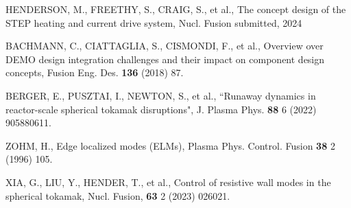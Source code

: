 \documentclass[10pt, a4paper, twoside]{article}
\begin{document}
\begin{thebibliography}{9}
    HENDERSON, M., FREETHY, S., CRAIG, S., et al., 
    The concept design of the STEP heating and current drive system,
    Nucl. Fusion
    submitted, 
    2024

    BACHMANN, C., CIATTAGLIA, S., CISMONDI, F., et al., 
    Overview over DEMO design integration challenges and their impact on component design concepts, 
    Fusion Eng. Des. 
    \textbf{136} 
    (2018)
    87.


    BERGER, E., PUSZTAI, I., NEWTON, S., et al.,
    ``Runaway dynamics in reactor-scale spherical tokamak disruptions",
    J. Plasma Phys. 
    \textbf{88} 6 
    (2022)
    905880611.

    ZOHM, H., 
    Edge localized modes (ELMs), 
    Plasma Phys. Control. Fusion 
    \textbf{38} 2 
    (1996) 
    105.

    XIA, G., LIU, Y., HENDER, T., et al.,
    Control of resistive wall modes in the spherical tokamak,
    Nucl. Fusion,
    \textbf{63} 2
    (2023)
    026021.



\end{thebibliography}
\end{document}
